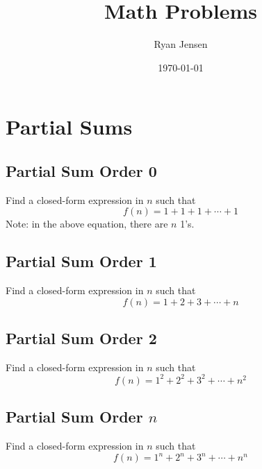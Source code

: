 \documentclass[letterpaper, 11pt]{report}
\numberwithin{equation}{section}
\begin{document}
	
	
	\author{Ryan Jensen}
	\title{Math Problems}
	\date{\today}
	\maketitle
	
	
	
	\tableofcontents
	
	
	
	
	
	
	\chapter{Partial Sums}
		
		
		
		\section{Partial Sum Order 0}
			
			
			Find a closed-form expression in $ n $ such that
			\begin{equation}
				f(n) = 1 + 1 + 1 + \cdots + 1
			\end{equation}
			Note: in the above equation, there are $n$ 1's.
			
			
		\section{Partial Sum Order 1}
			
			
			Find a closed-form expression in $ n $ such that
			\begin{equation}
				f(n) = 1 + 2 + 3 + \cdots + n
			\end{equation}
			
			
		\section{Partial Sum Order 2}
			
			
			Find a closed-form expression in $ n $ such that
			\begin{equation}
				f(n) = 1^2 + 2^2 + 3^2 + \cdots + n^2
			\end{equation}
			
			
		\section{Partial Sum Order $n$}
			
			
			Find a closed-form expression in $ n $ such that
			\begin{equation}
				f(n) = 1^n + 2^n + 3^n + \cdots + n^n
			\end{equation}
			
\end{document}
